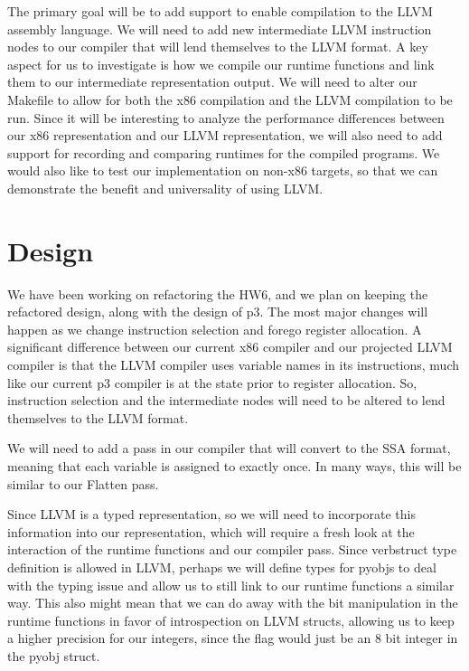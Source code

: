 \documentclass[11pt]{article}
\begin{document}
The primary goal will be to add support to enable compilation to the
LLVM assembly language.  We will need to add new intermediate LLVM
instruction nodes to our compiler that will lend themselves to the
LLVM format. A key aspect for us to investigate is how we compile our
runtime functions and link them to our intermediate representation
output.  We will need to alter our Makefile to allow for both the x86
compilation and the LLVM compilation to be run. Since it will be
interesting to analyze the performance differences between our x86
representation and our LLVM representation, we will also need to add
support for recording and comparing runtimes for the compiled
programs.  We would also like to test our implementation on non-x86
targets, so that we can demonstrate the benefit and universality of
using LLVM.

\section{Design}

We have been working on refactoring the HW6, and we plan on keeping
the refactored design, along with the design of p3. The most major
changes will happen as we change instruction selection and forego
register allocation. A significant difference between our current x86
compiler and our projected LLVM compiler is that the LLVM compiler
uses variable names in its instructions, much like our current p3
compiler is at the state prior to register allocation. So, instruction
selection and the intermediate nodes will need to be altered to lend
themselves to the LLVM format.

We will need to add a pass in our compiler that will convert to the
SSA format, meaning that each variable is assigned to exactly once. In
many ways, this will be similar to our Flatten pass.

Since LLVM is a typed representation, so we will need to incorporate
this information into our representation, which will require a fresh
look at the interaction of the runtime functions and our compiler
pass. Since verb{struct} type definition is allowed in LLVM, perhaps
we will define types for pyobjs to deal with the typing issue and
allow us to still link to our runtime functions a similar way.  This
also might mean that we can do away with the bit manipulation in the
runtime functions in favor of introspection on LLVM structs, allowing
us to keep a higher precision for our integers, since the flag would
just be an 8 bit integer in the pyobj struct.
\end{document}

